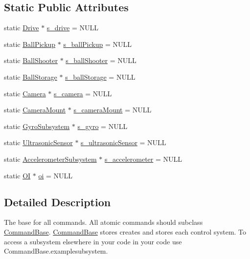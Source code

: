 \subsection*{\-Static \-Public \-Attributes}
\begin{DoxyCompactItemize}
\item 
static \hyperlink{class_drive}{\-Drive} $\ast$ \hyperlink{class_command_base_ad3e30f2241b0fc05c2dde2f20c1110c8}{s\-\_\-drive} = \-N\-U\-L\-L
\item 
static \hyperlink{class_ball_pickup}{\-Ball\-Pickup} $\ast$ \hyperlink{class_command_base_a06014394e7c262f1ef010dc2fe1b17a9}{s\-\_\-ball\-Pickup} = \-N\-U\-L\-L
\item 
static \hyperlink{class_ball_shooter}{\-Ball\-Shooter} $\ast$ \hyperlink{class_command_base_ac48c9220b0d3a09b0b058875eff8c650}{s\-\_\-ball\-Shooter} = \-N\-U\-L\-L
\item 
static \hyperlink{class_ball_storage}{\-Ball\-Storage} $\ast$ \hyperlink{class_command_base_a6e7f4b4c66e09b1d1d2e9496d0b018da}{s\-\_\-ball\-Storage} = \-N\-U\-L\-L
\item 
static \hyperlink{class_camera}{\-Camera} $\ast$ \hyperlink{class_command_base_a9586e8acac30698641eddb49066e1d47}{s\-\_\-camera} = \-N\-U\-L\-L
\item 
static \hyperlink{class_camera_mount}{\-Camera\-Mount} $\ast$ \hyperlink{class_command_base_a73790b416a401faa311259bd45f7aa47}{s\-\_\-camera\-Mount} = \-N\-U\-L\-L
\item 
static \hyperlink{class_gyro_subsystem}{\-Gyro\-Subsystem} $\ast$ \hyperlink{class_command_base_ab41fbac4795141797607460fedd04181}{s\-\_\-gyro} = \-N\-U\-L\-L
\item 
static \hyperlink{class_ultrasonic_sensor}{\-Ultrasonic\-Sensor} $\ast$ \hyperlink{class_command_base_a668786f77a2e65cd4f6beef52ba1538b}{s\-\_\-ultrasonic\-Sensor} = \-N\-U\-L\-L
\item 
static \hyperlink{class_accelerometer_subsystem}{\-Accelerometer\-Subsystem} $\ast$ \hyperlink{class_command_base_a2fd849df3b42d41c784179506228e841}{s\-\_\-accelerometer} = \-N\-U\-L\-L
\item 
static \hyperlink{class_o_i}{\-O\-I} $\ast$ \hyperlink{class_command_base_ae6807501159925367f8008fc0534eda5}{oi} = \-N\-U\-L\-L
\end{DoxyCompactItemize}


\subsection{\-Detailed \-Description}
\-The base for all commands. \-All atomic commands should subclass \hyperlink{class_command_base}{\-Command\-Base}. \hyperlink{class_command_base}{\-Command\-Base} stores creates and stores each control system. \-To access a subsystem elsewhere in your code in your code use \-Command\-Base.\-examplesubsystem. 

